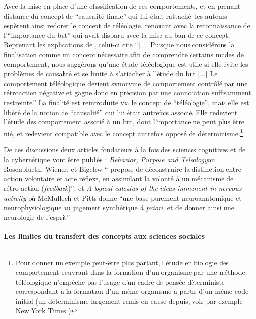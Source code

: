 Avec la mise en place d'une classification de ces comportements, et en prenant distance du concept de \enquote{causalité finale} qui lui était rattaché, les auteurs espèrent ainsi redorer le concept de téléologie, renouant avec la reconnaissance de l'\enquote{importance du but} qui avait disparu avec la mise au ban de ce concept. Reprenant les explications de \autocite[776]{Pouvreau2013}, celui-ci cite \autocite[23-24]{Rosenblueth1943} \enquote{[...] Puisque nous considérons la finalisation comme un concept nécessaire afin de comprendre certains modes de comportement, nous suggérons qu'une étude téléologique est utile si elle évite les problèmes de causalité et se limite à s'attacher à l'étude du but [...] Le comportement téléologique devient synonyme de comportement contrôlé par une rétroaction négative et gagne donc en précision par une connotation suffisamment restreinte.} La finalité est reintroduite via le concept de \enquote{téléologie}, mais elle est libéré de la notion de \enquote{causalité} qui lui était autrefois associé. Elle redevient l'étude des comportement associé à un but, dont l'importance ne peut plus être nié, et redevient compatible avec le concept autrefois opposé de déterminisme.\footnote{Pour donner un exemple peut-être plus parlant, l'étude en biologie des comportement oeuvrant dans la formation d'un organisme par une méthode téléologique n'empêche pas l'usage d'un cadre de pensée déterministe  correspondant à la formation d'un même organisme à partir d'un même code initial (un déterminisme largement remis en cause depuis, voir par exemple \href{http://www.nytimes.com/2014/01/21/science/seeing-x-chromosomes-in-a-new-light.html?ref=science&_r=0}{New York Times} )}

De ces discussions deux articles fondateurs à la fois des sciences cognitives \autocite[23]{Dupuy2000} et de la cybernétique vont être publiés : \textit{Behavior, Purpose and Teleology}ou Rosenblueth, Wiener, et Bigelow \enquote{ propose de déconstruire la distinction entre action volontaire et acte réflexe, en assimilant la volonté à un mécanisme de rétro-action (\textit{feedback})}; et \textit{A logical calculus of the ideas immanent in nervous activity} où McMulloch et Pitts donne \enquote{une base purement neuroanatomique et neurophysiologique au jugement synthétique \textit{à priori}, et de donner ainsi une neurologie de l'esprit}

\paragraph{ Les limites du transfert des concepts aux sciences sociales}

